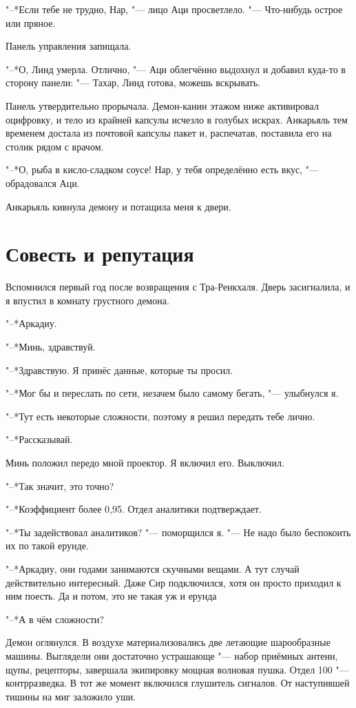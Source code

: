 \documentclass[a4paper,10pt]{book}
\newcommand{\ldotst}{\so{...}\xspace}
\begin{document}
"--*Если тебе не трудно, Нар, "--- лицо Аци просветлело. "--- Что-нибудь острое 
или пряное.

Панель управления запищала.

"--*О, Линд умерла. Отлично, "--- Аци облегчённо выдохнул и добавил куда-то в 
сторону панели: "--- Тахар, Линд готова, можешь вскрывать.

Панель утвердительно прорычала. Демон-канин этажом ниже активировал оцифровку, 
и тело из крайней капсулы исчезло в голубых искрах. Анкарьяль тем временем 
достала из почтовой капсулы пакет и, распечатав, поставила его на столик рядом 
с врачом.

"--*О, рыба в кисло-сладком соусе! Нар, у тебя определённо есть вкус, "--- 
обрадовался Аци.

Анкарьяль кивнула демону и потащила меня к двери.

\section{Совесть и репутация}

Вспомнился первый год после возвращения с Тра-Ренкхаля. Дверь засигналила, и я 
впустил в комнату грустного демона.

"--*Аркадиу.

"--*Минь, здравствуй.

"--*Здравствую. Я принёс данные, которые ты просил.

"--*Мог бы и переслать по сети, незачем было самому бегать, "--- улыбнулся я.

"--*Тут есть некоторые\ldotst сложности, поэтому я решил передать тебе лично.

"--*Рассказывай.

Минь положил передо мной проектор. Я включил его. Выключил.

"--*Так значит, это точно?

"--*Коэффициент более 0,95. Отдел аналитики подтверждает.

"--*Ты задействовал аналитиков? "--- поморщился я. "--- Не надо было беспокоить 
их по такой ерунде.

"--*Аркадиу, они годами занимаются скучными вещами. А тут случай действительно 
интересный. Даже Сир подключился, хотя он просто приходил к ним поесть. Да и 
потом, это не такая уж и ерунда\ldotst

"--*А в чём сложности?

Демон оглянулся. В воздухе материализовались две летающие шарообразные машины. 
Выглядели они достаточно устрашающе "--- набор приёмных антенн, щупы, 
рецепторы, 
завершала экипировку мощная волновая пушка. Отдел 100 "--- контрразведка. В тот 
же момент включился глушитель сигналов. От наступившей тишины на миг заложило 
уши.
\end{document}
